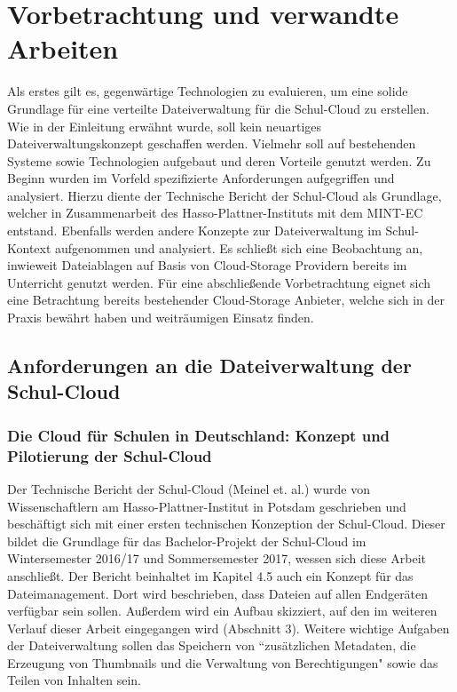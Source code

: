 \section{Vorbetrachtung und verwandte Arbeiten}
\label{sec:relatedwork}

Als erstes gilt es, gegenwärtige Technologien zu evaluieren, um eine solide Grundlage für eine verteilte Dateiverwaltung für die Schul-Cloud zu erstellen. Wie in der Einleitung erwähnt wurde, soll kein neuartiges Dateiverwaltungskonzept geschaffen werden. Vielmehr soll auf bestehenden Systeme sowie Technologien aufgebaut und deren Vorteile genutzt werden. Zu Beginn wurden im Vorfeld spezifizierte Anforderungen aufgegriffen und analysiert. Hierzu diente der Technische Bericht der Schul-Cloud \cite{paper:technischerbericht} als Grundlage, welcher in Zusammenarbeit des Hasso-Plattner-Instituts mit dem MINT-EC entstand. Ebenfalls werden andere Konzepte zur Dateiverwaltung im Schul-Kontext aufgenommen und analysiert. Es schließt sich eine Beobachtung an, inwieweit Dateiablagen auf Basis von Cloud-Storage Providern bereits im Unterricht genutzt werden. Für eine abschließende Vorbetrachtung eignet sich eine Betrachtung bereits bestehender Cloud-Storage Anbieter, welche sich in der Praxis bewährt haben und weiträumigen Einsatz finden.

\subsection{Anforderungen an die Dateiverwaltung der Schul-Cloud}

\subsubsection{Die Cloud für Schulen in Deutschland: Konzept und Pilotierung der Schul-Cloud}

Der Technische Bericht der Schul-Cloud \cite{paper:technischerbericht} (Meinel et. al.) wurde von Wissenschaftlern am Hasso-Plattner-Institut in Potsdam geschrieben und beschäftigt sich mit einer ersten technischen Konzeption der Schul-Cloud. Dieser bildet die Grundlage für das Bachelor-Projekt der Schul-Cloud im Wintersemester 2016/17 und Sommersemester 2017, wessen sich diese Arbeit anschließt. Der Bericht beinhaltet im Kapitel 4.5 auch ein Konzept für das Dateimanagement. Dort wird beschrieben, dass Dateien auf allen Endgeräten verfügbar sein sollen. Außerdem wird ein Aufbau skizziert, auf den im weiteren Verlauf dieser Arbeit eingegangen wird (Abschnitt 3). Weitere wichtige Aufgaben der Dateiverwaltung sollen das Speichern von ``zusätzlichen Metadaten, die Erzeugung von Thumbnails und die Verwaltung von Berechtigungen"   \cite{paper:technischerbericht} sowie das Teilen von Inhalten sein.

